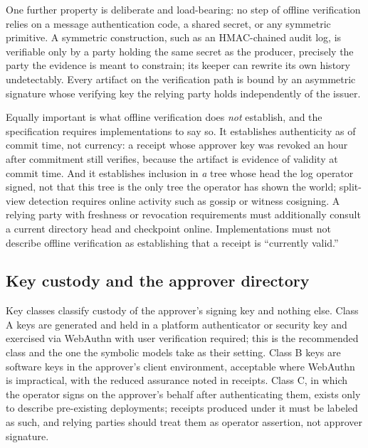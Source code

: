 \documentclass[11pt]{article}
\begin{document}
One further property is deliberate and load-bearing: no step of offline
verification relies on a message authentication code, a shared secret, or any
symmetric primitive. A symmetric construction, such as an HMAC-chained audit log,
is verifiable only by a party holding the same secret as the producer, precisely
the party the evidence is meant to constrain; its keeper can rewrite its own
history undetectably. Every artifact on the verification path is bound by an
asymmetric signature whose verifying key the relying party holds independently of
the issuer.

Equally important is what offline verification does \emph{not} establish, and the
specification requires implementations to say so. It establishes authenticity as
of commit time, not currency: a receipt whose approver key was revoked an hour
after commitment still verifies, because the artifact is evidence of validity at
commit time. And it establishes inclusion in \emph{a} tree whose head the log
operator signed, not that this tree is the only tree the operator has shown the
world; split-view detection requires online activity such as gossip or witness
cosigning. A relying party with freshness or revocation requirements must
additionally consult a current directory head and checkpoint online.
Implementations must not describe offline verification as establishing that a
receipt is ``currently valid.''

\subsection{Key custody and the approver directory}

Key classes classify custody of the approver's signing key and nothing else. Class
A keys are generated and held in a platform authenticator or security key and
exercised via WebAuthn with user verification required; this is the recommended
class and the one the symbolic models take as their setting. Class B keys are
software keys in the approver's client environment, acceptable where WebAuthn is
impractical, with the reduced assurance noted in receipts. Class C, in which the
operator signs on the approver's behalf after authenticating them, exists only to
describe pre-existing deployments; receipts produced under it must be labeled as
such, and relying parties should treat them as operator assertion, not approver
signature.
\end{document}
